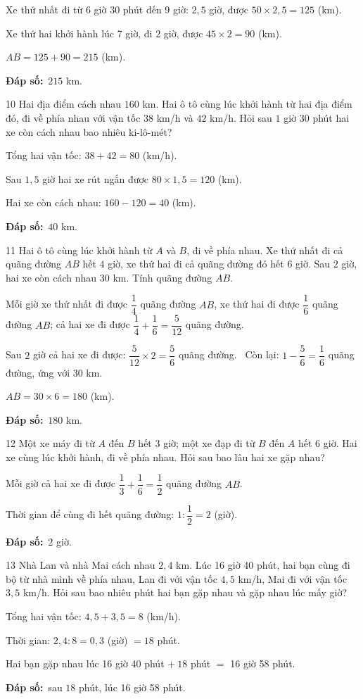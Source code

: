 \documentclass[11pt]{article}
\newif\ifsol \solfalse
\providecommand{\AnsWord}{Đáp số}
\newcommand{\dapso}[1]{\par\textbf{\AnsWord:}\ #1}
\newcommand{\probsol}[1]{%
  \begin{lrbox}{\solmeasure}\begin{minipage}{\dimexpr\linewidth-24pt\relax}#1\end{minipage}\end{lrbox}%
  \ifsol
    \begin{solbox}#1\end{solbox}%
  \else
    \setlength{\solht}{\dimexpr\ht\solmeasure+\dp\solmeasure+0.85cm\relax}%
    \ifdim\solht<1.35cm\setlength{\solht}{1.35cm}\fi
    \begin{tcolorbox}[colback=white,colframe=Line,boxrule=0.8pt,arc=5pt,
      left=8pt,right=8pt,top=4pt,bottom=4pt,height=\solht]{\footnotesize\color{Slate}\itshape\WorkWord}\end{tcolorbox}%
  \fi}
\newcommand{\gap}{\vspace{0.3cm}}
\def\WorkWord{Bài làm:}
\def\AnsWord{Đáp số}
\begin{document}
\probsol{
Xe thứ nhất đi từ 6 giờ 30 phút đến 9 giờ: $2{,}5$ giờ, được $50\times2{,}5=125$ (km).\par
Xe thứ hai khởi hành lúc 7 giờ, đi $2$ giờ, được $45\times2=90$ (km).\par
$AB=125+90=215$ (km).
\dapso{$215$ km.}}
\gap
\begin{probbox}{10}{\relax}
Hai địa điểm cách nhau $160$ km. Hai ô tô cùng lúc khởi hành từ hai địa điểm đó, đi về phía nhau với vận tốc $38$ km/h và $42$ km/h. Hỏi sau $1$ giờ $30$ phút hai xe còn cách nhau bao nhiêu ki-lô-mét?
\end{probbox}
\probsol{
Tổng hai vận tốc: $38+42=80$ (km/h).\par Sau $1{,}5$ giờ hai xe rút ngắn được $80\times1{,}5=120$ (km).\par Hai xe còn cách nhau: $160-120=40$ (km).
\dapso{$40$ km.}}
\gap
\begin{probbox}{11}{\relax}
Hai ô tô cùng lúc khởi hành từ $A$ và $B$, đi về phía nhau. Xe thứ nhất đi cả quãng đường $AB$ hết $4$ giờ, xe thứ hai đi cả quãng đường đó hết $6$ giờ. Sau $2$ giờ, hai xe còn cách nhau $30$ km. Tính quãng đường $AB$.
\end{probbox}
\probsol{
Mỗi giờ xe thứ nhất đi được $\dfrac14$ quãng đường $AB$, xe thứ hai đi được $\dfrac16$ quãng đường $AB$; cả hai xe đi được $\dfrac14+\dfrac16=\dfrac5{12}$ quãng đường.\par
Sau $2$ giờ cả hai xe đi được: $\dfrac5{12}\times2=\dfrac56$ quãng đường. \ Còn lại: $1-\dfrac56=\dfrac16$ quãng đường, ứng với $30$ km.\par
$AB=30\times6=180$ (km).
\dapso{$180$ km.}}
\gap
\begin{probbox}{12}{\relax}
Một xe máy đi từ $A$ đến $B$ hết $3$ giờ; một xe đạp đi từ $B$ đến $A$ hết $6$ giờ. Hai xe cùng lúc khởi hành, đi về phía nhau. Hỏi sau bao lâu hai xe gặp nhau?
\end{probbox}
\probsol{
Mỗi giờ cả hai xe đi được $\dfrac13+\dfrac16=\dfrac12$ quãng đường $AB$.\par Thời gian để cùng đi hết quãng đường: $1:\dfrac12=2$ (giờ).
\dapso{$2$ giờ.}}
\gap
\begin{probbox}{13}{\relax}
Nhà Lan và nhà Mai cách nhau $2{,}4$ km. Lúc 16 giờ 40 phút, hai bạn cùng đi bộ từ nhà mình về phía nhau, Lan đi với vận tốc $4{,}5$ km/h, Mai đi với vận tốc $3{,}5$ km/h. Hỏi sau bao nhiêu phút hai bạn gặp nhau và gặp nhau lúc mấy giờ?
\end{probbox}
\probsol{
Tổng hai vận tốc: $4{,}5+3{,}5=8$ (km/h).\par Thời gian: $2{,}4:8=0{,}3$ (giờ) $=18$ phút.\par Hai bạn gặp nhau lúc 16 giờ 40 phút $+\ 18$ phút $=$ 16 giờ 58 phút.
\dapso{sau $18$ phút, lúc 16 giờ 58 phút.}}
\end{document}
